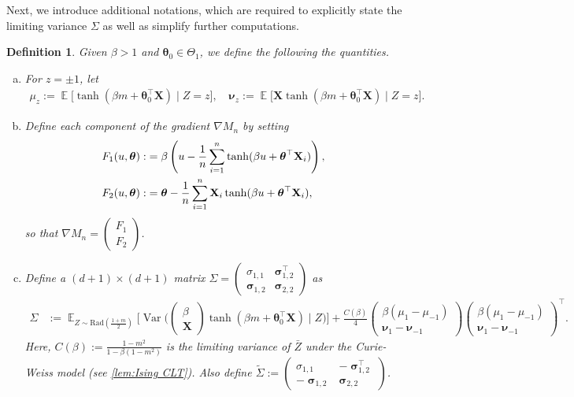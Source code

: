 \documentclass[preprint,reqno]{imsart}
\newtheorem{defi}{Definition}[section]
\newcommand{\ttheta}{\boldsymbol{\theta}}
\DeclareMathOperator{\ssigma}{\boldsymbol{\sigma}}
\DeclareMathOperator{\EE}{\mathbb{E}}
\DeclareMathOperator{\Var}{Var}
\newcommand{\X}{\mathbf{X}}
\DeclareMathOperator{\sumin}{\sum_{\mathnormal i=1}^{\mathnormal n}}
\begin{document}
\begin{appendix}
Next, we introduce additional notations, which are required to explicitly state the limiting variance $\Sigma$ as well as simplify further computations.
\begin{defi}\label{defi:sigma}
Given $\beta > 1$ and $\ttheta_0 \in \Theta_1$, we define the following the quantities.
\begin{enumerate}[(a),itemsep=2mm]
    \item 
    For $z = \pm 1$, let
\begin{align*}
    \mu_z := \EE\big[\tanh(\beta m + \ttheta_0^{\top} \X) \mid Z=z\big], \quad \boldsymbol{\nu}_z := \EE\big[\X \tanh(\beta m + \ttheta_0^{\top} \X) \mid Z=z\big].
\end{align*}

\item Define each component of the gradient $\nabla M_n$ by setting
    \begin{align*}
        F_1(u, \ttheta) :&= \beta \left(u - \frac{1}{n} \sumin \tanh(\beta u + \ttheta^{\top} \X_i) \right), \\
        F_2(u, \ttheta) :&= \ttheta- \frac{1}{n} \sumin \X_i \tanh(\beta u + \ttheta^{\top} \X_i),
    \end{align*}
    so that $\nabla M_n = \begin{pmatrix} F_1 \\ F_2 \end{pmatrix}$.

\item Define a $(d+1) \times (d+1)$ matrix $\Sigma = \begin{pmatrix}
    \sigma_{1,1} & \ssigma_{1,2}^{\top} \\
    \ssigma_{1,2} & \ssigma_{2,2}
\end{pmatrix}$ as
\begin{align*}
    \Sigma &:= \EE_{Z \sim \text{Rad}(\frac{1+m}{2})} \Big[\Var \Big( \begin{pmatrix}
    \beta \\ \X
\end{pmatrix}\tanh(\beta m + \ttheta_0^\top \X) \mid Z \Big) \Big] + \frac{C(\beta)}{4} \begin{pmatrix}
    \beta(\mu_1 - \mu_{-1}) \\ \boldsymbol{\nu}_1 - \boldsymbol{\nu}_{-1}
\end{pmatrix} \begin{pmatrix}
    \beta(\mu_1 - \mu_{-1}) \\ \boldsymbol{\nu}_1 - \boldsymbol{\nu}_{-1}
\end{pmatrix}^\top.
\end{align*}
%
%
%
%
%
%
%
%
Here, $C(\beta) := \frac{1-m^2}{1-\beta(1-m^2)}$ is the limiting variance of $\bar{Z}$ under the Curie-Weiss model (see \cref{lem:Ising CLT}). Also define $\tilde{\Sigma} := \begin{pmatrix}
        \sigma_{1,1}   & -\ssigma_{1,2}^\top \\
        - \ssigma_{1,2} & \ssigma_{2,2}
    \end{pmatrix}$.


\end{enumerate}
\end{defi}
\end{appendix}
\end{document}
